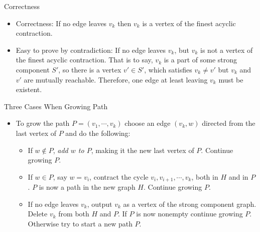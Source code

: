 \documentclass{beamer}
\begin{document}
\begin{frame}{Correctness}
	\begin{itemize}
		\item
		Correctness: If no edge leaves $v_k$ then $v_k$ is a vertex of the finest acyclic contraction.
		\item
		Easy to prove by contradiction: If no edge leaves $v_k$, but $v_k$ is not a vertex of the finest acyclic contraction.
		That is to say, $v_k$ is a part of some strong component $S'$, so there is a vertex $v'\in S'$, which satisfies $v_k\neq v'$
		but $v_k$ and $v'$ are mutually reachable. Therefore, one edge at least leaving $v_k$ must be existent.
	\end{itemize}
\end{frame}

\begin{frame}{Three Cases When Growing Path}
	\begin{itemize}
		\item
		To grow the path $P=(v_1,\cdots ,v_k)$ choose an edge $(v_k,w)$ directed from the last
		vertex of $P$ and do the following:
		\begin{itemize}
			\item
			If $w\notin P$, \emph{add $w$ to $P$}, making it the new last vertex of $P$. Continue growing $P$.
			\item
			If $w\in P$, say $w=v_i$, contract the cycle $v_i, v_{i+1}, \cdots, v_k$, both in $H$
			and in $P$. $P$ is now a path in the new graph $H$. Continue growing $P$.
			\item
			If no edge leaves $v_k$, output $v_k$ as a vertex of the strong component graph. Delete $v_k$
			from both $H$ and $P$. If $P$ is now nonempty continue growing $P$. Otherwise try to start a
			new path $P$.
		\end{itemize}
	\end{itemize}
\end{frame}
\end{document}
